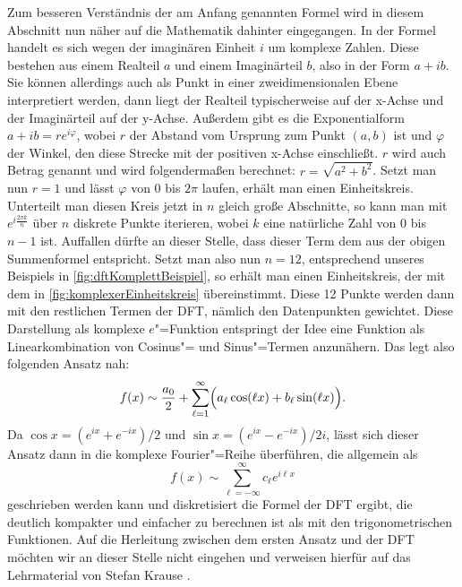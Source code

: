 Zum besseren Verständnis der am Anfang genannten Formel wird in diesem Abschnitt nun näher auf die Mathematik dahinter eingegangen. In der Formel handelt es sich wegen der imaginären Einheit $i$ um komplexe Zahlen. Diese bestehen aus einem Realteil $a$ und einem Imaginärteil $b$, also in der Form $a + ib$. Sie können allerdings auch als Punkt in einer zweidimensionalen Ebene interpretiert werden, dann liegt der Realteil typischerweise auf der x-Achse und der Imaginärteil auf der y-Achse. Außerdem gibt es die Exponentialform $a+ib=re^{i\varphi}$, wobei $r$ der Abstand vom Ursprung zum Punkt $(a,b)$ ist und $\varphi$ der Winkel, den diese Strecke mit der positiven x-Achse einschließt. $r$ wird auch Betrag genannt und wird folgendermaßen berechnet: $r=\sqrt{a^2+b^2}$. Setzt man nun $r=1$ und lässt $\varphi$ von 0 bis $2\pi$ laufen, erhält man einen Einheitskreis. Unterteilt man diesen Kreis jetzt in $n$ gleich große Abschnitte, so kann man mit $e^{i\frac{2\pi k}{n}}$ über $n$ diskrete Punkte iterieren, wobei $k$ eine natürliche Zahl von 0 bis $n-1$ ist. Auffallen dürfte an dieser Stelle, dass dieser Term dem aus der obigen Summenformel entspricht. Setzt man also nun $n=12$, entsprechend unseres Beispiels in \autoref{fig:dftKomplettBeispiel}, so erhält man einen Einheitskreis, der mit dem in \autoref{fig:komplexerEinheitskreis} übereinstimmt. Diese 12 Punkte werden dann mit den restlichen Termen der \acs{DFT}, nämlich den Datenpunkten gewichtet. Diese Darstellung als komplexe $e$"=Funktion entspringt der Idee eine Funktion als Linearkombination von Cosinus"= und Sinus"=Termen anzunähern. Das legt also folgenden Ansatz nah: \[f(x)\sim\frac{a_0}{2}+\sum_{\ell=1}^{\infty}\Bigl(a_\ell\cos(\ell x)+b_\ell\sin(\ell x)\Bigr).\] Da $\cos x = (e^{ix}+e^{-ix})/2 \text{ und } \sin x = (e^{ix}-e^{-ix})/2i$, lässt sich dieser Ansatz dann in die komplexe Fourier"=Reihe überführen, die allgemein als \[f(x) \sim \sum_{\ell = -\infty}^\infty c_\ell e^{i\ell x}\] geschrieben werden kann und diskretisiert die Formel der \acs{DFT} ergibt, die deutlich kompakter und einfacher zu berechnen ist als mit den trigonometrischen Funktionen. Auf die Herleitung zwischen dem ersten Ansatz und der \acs{DFT} möchten wir an dieser Stelle nicht eingehen und verweisen hierfür auf das Lehrmaterial von Stefan Krause \cite{fourierundwavelet}.

